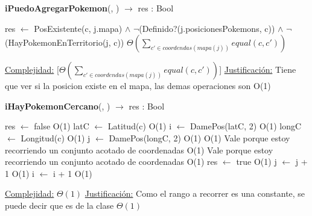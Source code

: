 \begin{algorithm}[H]{\textbf{iPuedoAgregarPokemon}(, ) $\to$ res : Bool} 
	\begin{algorithmic}
		\State res $\gets$ PosExistente(c, j.mapa) $\land$ $\lnot$(Definido?(j.posicionesPokemons, c)) $\land$ $\lnot$(HayPokemonEnTerritorio(j, c))  \Comment $\Theta\left(\displaystyle\sum_{c' \in coordendas(mapa(j))}equal(c,c')\right)$
	
		\medskip
		\Statex \underline{Complejidad:} [$\Theta\left(\displaystyle\sum_{c' \in coordendas(mapa(j))}equal(c,c')\right)$]
		\Statex \underline{Justificación:} Tiene que ver si la posicion existe en el mapa, las demas operaciones son O(1)
     \end{algorithmic}
 \end{algorithm}
 
 \begin{algorithm}[H]{\textbf{iHayPokemonCercano}(, ) $\to$ res : Bool} 
	\begin{algorithmic}
		\State res $\gets$ false	\Comment O(1) 
		\State latC $\gets$ Latitud(c)	\Comment O(1)
		\State i $\gets$ DamePos(latC, 2) \Comment O(1)		
		\State longC $\gets$ Longitud(c)	\Comment O(1)
		\State j $\gets$ DamePos(longC, 2) \Comment O(1)
			\Comment O(1) {Vale porque estoy recorriendo un conjunto acotado de coordenadas}
				\Comment O(1) {Vale porque estoy recorriendo un conjunto acotado de coordenadas}
					\Comment O(1)
					\State res $\gets$ true	\Comment O(1) 
				\EndIf
				\State j $\gets$ j + 1	\Comment O(1)
			\EndWhile
			\State i $\gets$ i + 1	\Comment O(1)
		\EndWhile
	
		\medskip
		\Statex \underline{Complejidad:} $\Theta(1)$
		\Statex \underline{Justificación:} Como el rango a recorrer es una constante, se puede decir que es de la clase $\Theta(1)$
     \end{algorithmic}
 \end{algorithm}
 
